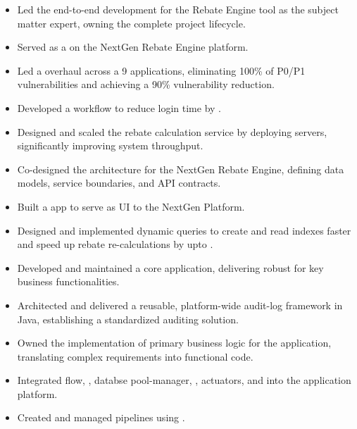 \documentclass[10pt,a4paper,ragged2e, normalphoto]{altacv}
\begin{document}
\begin{itemize}
  \item Led the end-to-end development for the Rebate Engine tool as the subject matter expert, owning the complete project lifecycle.
  \item Served as a  on the NextGen Rebate Engine platform.
  \item Led a  overhaul across a 9 applications, eliminating 100\% of P0/P1 vulnerabilities and achieving a 90\% vulnerability reduction.
  \item Developed a  workflow to reduce login time by .
  \item Designed and scaled the rebate calculation service by deploying  servers, significantly improving system throughput.
  \item Co-designed the architecture for the NextGen Rebate Engine, defining data models, service boundaries, and API contracts.
  \item Built a  app to serve as UI to the NextGen Platform.
  \item Designed and implemented dynamic  queries to create and read indexes faster and speed up rebate re-calculations by upto .
\end{itemize}
\begin{itemize}
	\item Developed and maintained a core  application, delivering robust  for key business functionalities.
	\item Architected and delivered a reusable, platform-wide audit-log framework in Java, establishing a standardized auditing solution.
	\item Owned the implementation of primary business logic for the application, translating complex requirements into functional code.
	\item Integrated  flow, , databse pool-manager, , actuators, and  into the application platform.
	\item Created and managed  pipelines using .
 \end{itemize}
\end{document}
